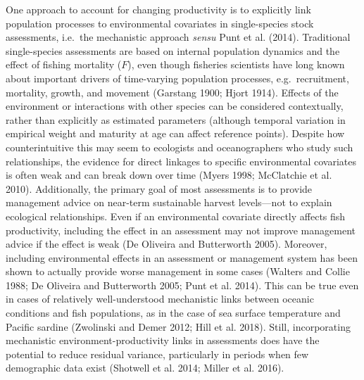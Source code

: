 \documentclass[]{article}
\begin{document}
One approach to account for changing productivity is to explicitly link
population processes to environmental covariates in single-species stock
assessments, i.e.~the mechanistic approach \emph{sensu} Punt et al.
(2014). Traditional single-species assessments are based on internal
population dynamics and the effect of fishing mortality (\(F\)), even
though fisheries scientists have long known about important drivers of
time-varying population processes, e.g.~recruitment, mortality, growth,
and movement (Garstang 1900; Hjort 1914). Effects of the environment or
interactions with other species can be considered contextually, rather
than explicitly as estimated parameters (although temporal variation in
empirical weight and maturity at age can affect reference points).
Despite how counterintuitive this may seem to ecologists and
oceanographers who study such relationships, the evidence for direct
linkages to specific environmental covariates is often weak and can
break down over time (Myers 1998; McClatchie et al. 2010). Additionally,
the primary goal of most assessments is to provide management advice on
near-term sustainable harvest levels---not to explain ecological
relationships. Even if an environmental covariate directly affects fish
productivity, including the effect in an assessment may not improve
management advice if the effect is weak (De Oliveira and Butterworth
2005). Moreover, including environmental effects in an assessment or
management system has been shown to actually provide worse management in
some cases (Walters and Collie 1988; De Oliveira and Butterworth 2005;
Punt et al. 2014). This can be true even in cases of relatively
well-understood mechanistic links between oceanic conditions and fish
populations, as in the case of sea surface temperature and Pacific
sardine (Zwolinski and Demer 2012; Hill et al. 2018). Still,
incorporating mechanistic environment-productivity links in assessments
does have the potential to reduce residual variance, particularly in
periods when few demographic data exist (Shotwell et al. 2014; Miller et
al. 2016).
\end{document}
